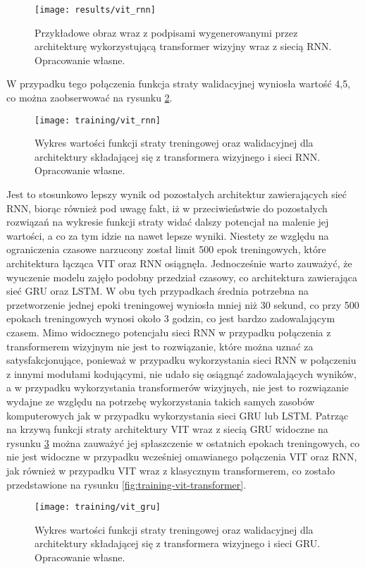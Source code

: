 \begin{figure}[H]
    \centering
    \texttt{[image: results/vit\_rnn]}
    \caption{Przykładowe obraz wraz z podpisami wygenerowanymi przez architekturę wykorzystującą transformer wizyjny wraz z siecią RNN. Opracowanie własne.}
    \label{fig:results-vit-rnn}
\end{figure}
\noindent W przypadku tego połączenia funkcja straty walidacyjnej wyniosła wartość 4,5, co można zaobserwować na rysunku \ref{fig:training-vit-rnn}.
\begin{figure}[H]
    \centering
    \texttt{[image: training/vit\_rnn]}
    \caption{Wykres wartości funkcji straty treningowej oraz walidacyjnej dla architektury składającej się z transformera wizyjnego i sieci RNN. Opracowanie własne.}
    \label{fig:training-vit-rnn}
\end{figure}
\noindent Jest to stosunkowo lepszy wynik od pozostałych architektur zawierających sieć RNN, biorąc również pod uwagę fakt, iż w przeciwieństwie do pozostałych rozwiązań na wykresie funkcji straty widać dalszy potencjał na malenie jej wartości, a co za tym idzie na nawet lepsze wyniki. Niestety ze względu na ograniczenia czasowe narzucony został limit 500 epok treningowych, które architektura łącząca VIT oraz RNN osiągnęła. Jednocześnie warto zauważyć, że wyuczenie modelu zajęło podobny przedział czasowy, co architektura zawierająca sieć GRU oraz LSTM. W obu tych przypadkach średnia potrzebna na przetworzenie jednej epoki treningowej wyniosła mniej niż 30 sekund, co przy 500 epokach treningowych wynosi około 3 godzin, co jest bardzo zadowalającym czasem. Mimo widocznego potencjału sieci RNN w przypadku połączenia z transformerem wizyjnym nie jest to rozwiązanie, które można uznać za satysfakcjonujące, ponieważ w przypadku wykorzystania sieci RNN w połączeniu z innymi modułami kodującymi, nie udało się osiągnąć zadowalających wyników, a w przypadku wykorzystania transformerów wizyjnych, nie jest to rozwiązanie wydajne ze względu na potrzebę wykorzystania takich samych zasobów komputerowych jak w przypadku wykorzystania sieci GRU lub LSTM. Patrząc na krzywą funkcji straty architektury VIT wraz z siecią GRU widoczne na rysunku \ref{fig:training-vit-gru} można zauważyć jej spłaszczenie w ostatnich epokach treningowych, co nie jest widoczne w przypadku wcześniej omawianego połączenia VIT oraz RNN, jak również w przypadku VIT wraz z klasycznym transformerem, co zostało przedstawione na rysunku \ref{fig:training-vit-transformer}.
\begin{figure}[H]
    \centering
    \texttt{[image: training/vit\_gru]}
    \caption{Wykres wartości funkcji straty treningowej oraz walidacyjnej dla architektury składającej się z transformera wizyjnego i sieci GRU. Opracowanie własne.}
    \label{fig:training-vit-gru}
\end{figure}
